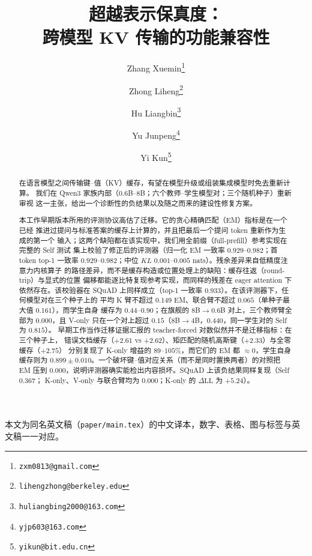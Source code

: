 \documentclass[11pt]{article}
\title{超越表示保真度：\\
跨模型 KV 传输的功能兼容性}
\author{%
  Zhang Xuemin\thanks{\texttt{zxm0813@gmail.com}}
  \and Zhong Liheng\thanks{\texttt{lihengzhong@berkeley.edu}}
  \and Hu Liangbin\thanks{\texttt{huliangbing2000@163.com}}
  \and Yu Junpeng\thanks{\texttt{yjp603@163.com}}
  \and Yi Kun\thanks{\texttt{yikun@bit.edu.cn}}%
}
\date{}
\newcommand{\dll}{\Delta\text{LL}}
\begin{document}
\maketitle

\begin{center}
\small 本文为同名英文稿（\texttt{paper/main.tex}）的中文译本，数字、表格、图与标签与英文稿一一对应。
\end{center}

\begin{abstract}
在语言模型之间传输键--值（KV）缓存，有望在模型升级或组装集成模型时免去重新计算。
我们在 Qwen3 家族内部（$0.6$B--$8$B；六个教师--学生模型对；三个随机种子）重新审视
这一主张，给出一个诊断性的负结果以及随之而来的建设性修复方案。

本工作早期版本所用的评测协议高估了迁移。它的贪心精确匹配（EM）指标是在一个已经
推进过提问与标准答案的缓存上计算的，并且把最后一个提问 token 重新作为生成的第一个
输入；这两个缺陷都在该实现中，我们用全前缀（full-prefill）参考实现在完整的 Self 测试
集上校验了修正后的评测器（归一化 EM 一致率 $0.929$--$0.982$；首 token top-1 一致率
$0.929$--$0.982$；中位 $KL$ $0.001$--$0.005$ nats）。残余差异来自低精度注意力内核算子
的路径差异，而不是缓存构造或位置处理上的缺陷：缓存往返（round-trip）与显式的位置
偏移都能逐比特复现参考实现，而同样的残差在 eager attention 下依然存在。该校验器在
SQuAD 上同样成立（top-1 一致率 $0.933$）。在该评测器下，任何模型对在三个种子上的
平均 K 臂不超过 $0.149$ EM、联合臂不超过 $0.065$（单种子最大值 $0.161$），而学生自身
缓存为 $0.44$--$0.90$；在旗舰的 $8$B$\to0.6$B 对上，三个教师臂全部为 $0.000$，且
V-only 只在一个对上超过 $0.15$（$8$B$\to4$B，$0.440$，同一学生对的 Self 为 $0.815$）。
早期工作当作迁移证据汇报的 teacher-forced 对数似然并不是迁移指标：在三个种子上，
错误文档缓存（$+2.61$ vs $+2.62$）、矩匹配的随机高斯键（$+2.33$）与全零缓存（$+2.75$）
分别复现了 K-only 增益的 $89$--$105\%$，而它们的 EM 都 $\approx 0$，学生自身缓存则为
$0.899\pm0.010$。一个破坏键--值对应关系（而不是同时置换两者）的对照把 EM 压到
$0.000$，说明评测器确实能检出内容损坏。SQuAD 上该负结果同样复现（Self $0.367$；
K-only、V-only 与联合臂均为 $0.000$；K-only 的 $\dll$ 为 $+5.24$）。


\end{abstract}
\end{document}
